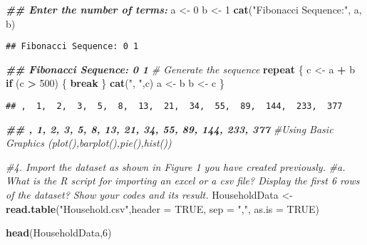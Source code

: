 \documentclass[
]{article}
\newenvironment{Shaded}{\begin{snugshade}}{\end{snugshade}}
\newcommand{\AttributeTok}[1]{\textcolor[rgb]{0.13,0.29,0.53}{#1}}
\newcommand{\CommentTok}[1]{\textcolor[rgb]{0.56,0.35,0.01}{\textit{#1}}}
\newcommand{\ConstantTok}[1]{\textcolor[rgb]{0.56,0.35,0.01}{#1}}
\newcommand{\ControlFlowTok}[1]{\textcolor[rgb]{0.13,0.29,0.53}{\textbf{#1}}}
\newcommand{\DecValTok}[1]{\textcolor[rgb]{0.00,0.00,0.81}{#1}}
\newcommand{\DocumentationTok}[1]{\textcolor[rgb]{0.56,0.35,0.01}{\textbf{\textit{#1}}}}
\newcommand{\FunctionTok}[1]{\textcolor[rgb]{0.13,0.29,0.53}{\textbf{#1}}}
\newcommand{\NormalTok}[1]{#1}
\newcommand{\OtherTok}[1]{\textcolor[rgb]{0.56,0.35,0.01}{#1}}
\newcommand{\SpecialCharTok}[1]{\textcolor[rgb]{0.81,0.36,0.00}{\textbf{#1}}}
\newcommand{\StringTok}[1]{\textcolor[rgb]{0.31,0.60,0.02}{#1}}
\begin{document}
\begin{Shaded}
\begin{Highlighting}[]
\DocumentationTok{\#\# Enter the number of terms:}
\NormalTok{a }\OtherTok{\textless{}{-}} \DecValTok{0}
\NormalTok{b }\OtherTok{\textless{}{-}} \DecValTok{1}
\FunctionTok{cat}\NormalTok{(}\StringTok{"Fibonacci Sequence:"}\NormalTok{, a, b)}
\end{Highlighting}
\end{Shaded}

\begin{verbatim}
## Fibonacci Sequence: 0 1
\end{verbatim}

\begin{Shaded}
\begin{Highlighting}[]
\DocumentationTok{\#\# Fibonacci Sequence: 0 1}
\CommentTok{\# Generate the sequence}
\ControlFlowTok{repeat}\NormalTok{ \{}
\NormalTok{c }\OtherTok{\textless{}{-}}\NormalTok{ a }\SpecialCharTok{+}\NormalTok{ b}
\ControlFlowTok{if}\NormalTok{ (c }\SpecialCharTok{\textgreater{}} \DecValTok{500}\NormalTok{) \{}
\ControlFlowTok{break}
\NormalTok{\}}
\FunctionTok{cat}\NormalTok{(}\StringTok{", "}\NormalTok{,c)}
\NormalTok{a }\OtherTok{\textless{}{-}}\NormalTok{ b}
\NormalTok{b }\OtherTok{\textless{}{-}}\NormalTok{ c}
\NormalTok{\}}
\end{Highlighting}
\end{Shaded}

\begin{verbatim}
## ,  1,  2,  3,  5,  8,  13,  21,  34,  55,  89,  144,  233,  377
\end{verbatim}

\begin{Shaded}
\begin{Highlighting}[]
\DocumentationTok{\#\# , 1, 2, 3, 5, 8, 13, 21, 34, 55, 89, 144, 233, 377}
\CommentTok{\#Using Basic Graphics (plot(),barplot(),pie(),hist())}

\CommentTok{\#4. Import the dataset as shown in Figure 1 you have created previously.}
\CommentTok{\#a. What is the R script for importing an excel or a csv file? Display the first 6 rows of the dataset? Show your codes and its result.}
\NormalTok{HouseholdData }\OtherTok{\textless{}{-}}\FunctionTok{read.table}\NormalTok{(}\StringTok{"Household.csv"}\NormalTok{,}\AttributeTok{header =} \ConstantTok{TRUE}\NormalTok{, }\AttributeTok{sep =} \StringTok{","}\NormalTok{, }\AttributeTok{as.is =} \ConstantTok{TRUE}\NormalTok{)}

\FunctionTok{head}\NormalTok{(HouseholdData,}\DecValTok{6}\NormalTok{)}
\end{Highlighting}
\end{Shaded}
\end{document}
